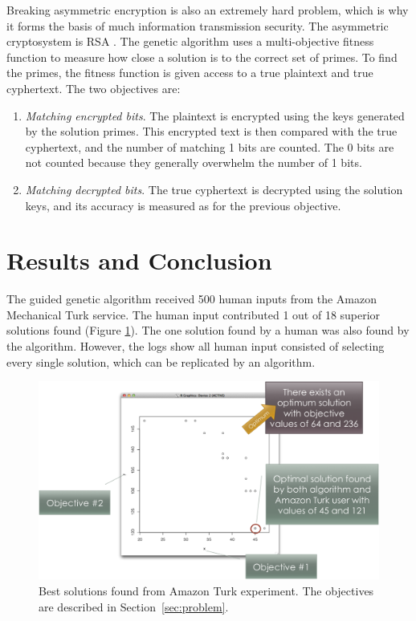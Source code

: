 Breaking asymmetric encryption is also an extremely hard problem, which is why it forms the basis of much information transmission security.  The asymmetric cryptosystem is RSA \citep{cormen01:_introd_to_algor}.  The genetic algorithm uses a multi-objective fitness function to measure how close a solution is to the correct set of primes.  To find the primes, the fitness function is given access to a true plaintext and true cyphertext. The two objectives are:

\begin{enumerate}
\item \emph{Matching encrypted bits}. The plaintext is encrypted using the keys generated by the solution primes.  This encrypted text is then compared with the true cyphertext, and the number of matching 1 bits are counted.  The 0 bits are not counted because they generally overwhelm the number of 1 bits.

\item \emph{Matching decrypted bits}. The true cyphertext is decrypted using the solution keys, and its accuracy is measured as for the previous objective.
\end{enumerate}

\section{Results and Conclusion}
The guided genetic algorithm received 500 human inputs from the Amazon Mechanical Turk service.  The human input contributed 1 out of 18 superior solutions found (Figure \ref{fig:results}).  The one solution found by a human was also found by the algorithm.  However, the logs show all human input consisted of selecting every single solution, which can be replicated by an algorithm.

\begin{figure}[!t]
  \centering
  \includegraphics[width=4.5in]{HollowayResults}
  \caption{Best solutions found from Amazon Turk experiment.  The objectives are described in Section~\ref{sec:problem}.}
  \label{fig:results}
\end{figure}

